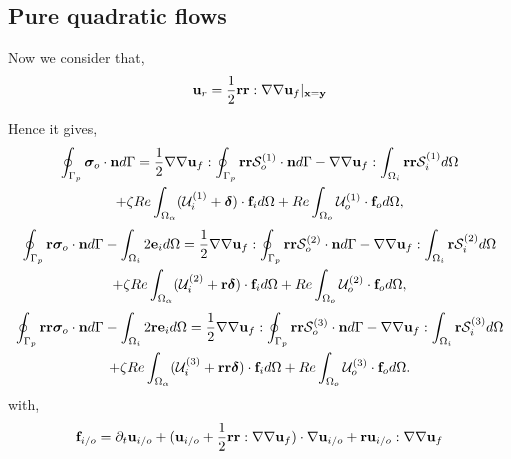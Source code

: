 \subsection{Pure quadratic flows}
Now we consider that, 
\begin{equation}
    \textbf{u}_r = \frac{1}{2}\textbf{rr} : \grad\grad \textbf{u}_f |_{\textbf{x}=\textbf{y}}
\end{equation}

Hence it gives, 
\begin{multline}
    \intS[p]{\bm\sigma_{o}\cdot \textbf{n}}
    =
    \frac{1}{2}\grad\grad \textbf{u}_f : \intS[p]{\textbf{rr} \mathcal{S}_o^{(1)} \cdot \textbf{n}}
    -\grad\grad \textbf{u}_f:\intO[i]{ \textbf{rr}\mathcal{S}_{i}^{(1)}} 
    \\ 
    + \zeta Re \intO{(\mathcal{U}_{i}^{(1)} + \bm\delta)\cdot \textbf{f}_{i}} 
    + Re\intO[o]{\mathcal{U}_{o}^{(1)}\cdot \textbf{f}_{o}},
\end{multline}
\begin{multline}
    \intS[p]{\textbf{r}  \bm\sigma_{o}\cdot \textbf{n}}
    - \intO[i]{2\textbf{e}_i}
    =
    \frac{1}{2}\grad\grad \textbf{u}_f : \intS[p]{\textbf{rr}  \mathcal{S}_o^{(2)}\cdot \textbf{n}}
    -\grad\grad \textbf{u}_f:\intO[i]{ \textbf{r}\mathcal{S}_i^{(2)}} 
    \\ 
    + \zeta Re \intO{(\mathcal{U}_{i}^{(2)}  + \textbf{r}\bm\delta)\cdot \textbf{f}_{i}} 
    + Re\intO[o]{\mathcal{U}_{o}^{(2)}\cdot \textbf{f}_{o}},
\end{multline}
\begin{multline}
    \intS[p]{\textbf{rr}  \bm\sigma_{o}\cdot \textbf{n}}
    - \intO[i]{2\textbf{re}_i }
    =
    \frac{1}{2}\grad\grad \textbf{u}_f : \intS[p]{\textbf{rr} \mathcal{S}_o^{(3)}\cdot \textbf{n}}
    -\grad\grad \textbf{u}_f : \intO[i]{\textbf{r}\mathcal{S}_i^{(3)}}\\
    + \zeta Re \intO{(\mathcal{U}_{i}^{(3)} + \textbf{rr}\bm\delta)\cdot \textbf{f}_{i}} 
    + Re\intO[o]{\mathcal{U}_{o}^{(3)} \cdot \textbf{f}_{o}}.
\end{multline}
with, 
\begin{equation}
    \textbf{f}_{i/o}
    =
    \pddt \textbf{u}_{i/o}
    + 
    (\textbf{u}_{i/o} + \frac{1}{2}\textbf{rr} : \grad\grad \textbf{u}_f)\cdot \grad \textbf{u}_{i/o}
    + \textbf{r}\textbf{u}_{i/o} : \grad\grad \textbf{u}_f
\end{equation}